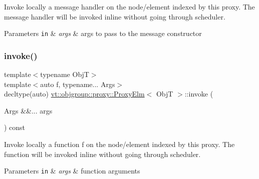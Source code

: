 Invoke locally a message handler on the node/element indexed by this proxy. The message handler will be invoked inline without going through scheduler. 


\begin{DoxyParams}[1]{Parameters}
\mbox{\tt in}  & {\em args} & args to pass to the message constructor \\
\hline
\end{DoxyParams}
\mbox{\label{structvt_1_1objgroup_1_1proxy_1_1_proxy_elm_aa321d09d21afe3491f03a956f83525dd}} 
\subsubsection{\texorpdfstring{invoke()}{invoke()}\hspace{0.1cm}{\footnotesize\ttfamily [2/2]}}
{\footnotesize\ttfamily template$<$typename ObjT$>$ \\
template$<$auto f, typename... Args$>$ \\
decltype(auto) \hyperlink{structvt_1_1objgroup_1_1proxy_1_1_proxy_elm}{vt\+::objgroup\+::proxy\+::\+Proxy\+Elm}$<$ ObjT $>$\+::invoke (\begin{DoxyParamCaption}\item[{Args \&\&...}]{args }\end{DoxyParamCaption}) const}



Invoke locally a function \textquotesingle{}f\textquotesingle{} on the node/element indexed by this proxy. The function will be invoked inline without going through scheduler. 


\begin{DoxyParams}[1]{Parameters}
\mbox{\tt in}  & {\em args} & function arguments \\
\hline
\end{DoxyParams}
\mbox{\label{structvt_1_1objgroup_1_1proxy_1_1_proxy_elm_a9211613f646a4f3d215cf1d9e76219db}} 
